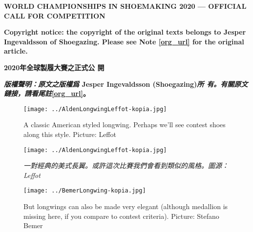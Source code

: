 \begin{paracol}{2}

    \setlength{\columnsep}{3.5em}
    \setlength{\columnseprule}{0.1pt}

    {\Large \textbf{WORLD CHAMPIONSHIPS IN SHOEMAKING 2020 --- OFFICIAL CALL FOR COMPETITION}}

    \textbf{{\tnr Copyright notice: the copyright of the original texts belongs to
    Jesper Ingevaldsson of Shoegazing. Please see Note \ref{org_url} for
    the original article.}}

    \vspace{1em}

    \switchcolumn
    {\Large \textbf{2020年全球製履大賽之正式公
    開}}

    \vspace{2em}

    \textbf{{\textit{版權聲明：原文之版權爲} {\tnr Jesper Ingevaldsson (Shoegazing)}\textit{所
    有。有關原文鏈接，請看尾註}\ref{org_url}。}}
    \switchcolumn*

    \begin{figure}[h]
        \centering
        \texttt{[image: ../AldenLongwingLeffot-kopia.jpg]}
        \captionsetup{labelformat=empty}
        \caption{\tnr A classic American styled longwing. Perhaps we'll see contest shoes along this style. Picture: Leffot}
        \label{}
    \end{figure}

    \switchcolumn
    \begin{figure}[h]
        \centering
        \texttt{[image: ../AldenLongwingLeffot-kopia.jpg]}
        \captionsetup{labelformat=empty}
        \caption{\textit{一對經典的美式長翼。或許這次比賽我們會看到類似的風格。圖源：\textnormal{{\tnr Leffot}}}}
        \label{}
    \end{figure}
    \switchcolumn*

    \begin{figure}[h]
        \centering
        \texttt{[image: ../BemerLongwing-kopia.jpg]}
        \captionsetup{labelformat=empty}
        \caption{\tnr But longwings can also be made very elegant (although medallion is missing here, if you compare to contest criteria). Picture: Stefano Bemer}
        \label{}
    \end{figure}


\end{paracol}

